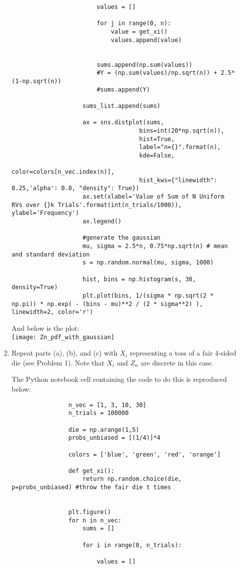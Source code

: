 \documentclass[]{article}
\begin{document}
\begin{enumerate}
\begin{enumerate}
\begin{lstlisting}
						values = []
				
						for j in range(0, n):
							value = get_xi()
							values.append(value)
				
				
						sums.append(np.sum(values))
						#Y = (np.sum(values)/np.sqrt(n)) + 2.5*(1-np.sqrt(n))
						#sums.append(Y)
				
					sums_list.append(sums)
				
					ax = sns.distplot(sums,
									bins=int(20*np.sqrt(n)),
									hist=True,
									label="n={}".format(n),
									kde=False,
									color=colors[n_vec.index(n)],
									hist_kws={"linewidth": 0.25,'alpha': 0.8, "density": True})
					ax.set(xlabel='Value of Sum of N Uniform RVs over {}k Trials'.format(int(n_trials/1000)), ylabel='Frequency')
					ax.legend()
				
					#generate the gaussian
					mu, sigma = 2.5*n, 0.75*np.sqrt(n) # mean and standard deviation
					s = np.random.normal(mu, sigma, 1000)
				
					hist, bins = np.histogram(s, 30, density=True)
					plt.plot(bins, 1/(sigma * np.sqrt(2 * np.pi)) * np.exp( - (bins - mu)**2 / (2 * sigma**2) ), linewidth=2, color='r')
			\end{lstlisting}
		
			And below is the plot:\\
			
			\texttt{[image: Zn\_pdf\_with\_gaussian]}
			
			\item Repeat parts (a), (b), and (c) with $X_i$ representing a toss of a fair 4-sided die (see Problem 1). Note that $X_i$ and $Z_n$ are discrete in this case.
			
			The Python notebook cell containing the code to do this is reproduced below:
			
			\begin{lstlisting}
				n_vec = [1, 3, 10, 30]
				n_trials = 100000
				
				die = np.arange(1,5)
				probs_unbiased = [(1/4)]*4
				
				colors = ['blue', 'green', 'red', 'orange']
				
				def get_xi():
					return np.random.choice(die, p=probs_unbiased) #throw the fair die t times
				
				
				plt.figure()
				for n in n_vec:
					sums = []
				
					for i in range(0, n_trials):
				
						values = []
				

\end{lstlisting}
\end{enumerate}
\end{enumerate}
\end{document}
